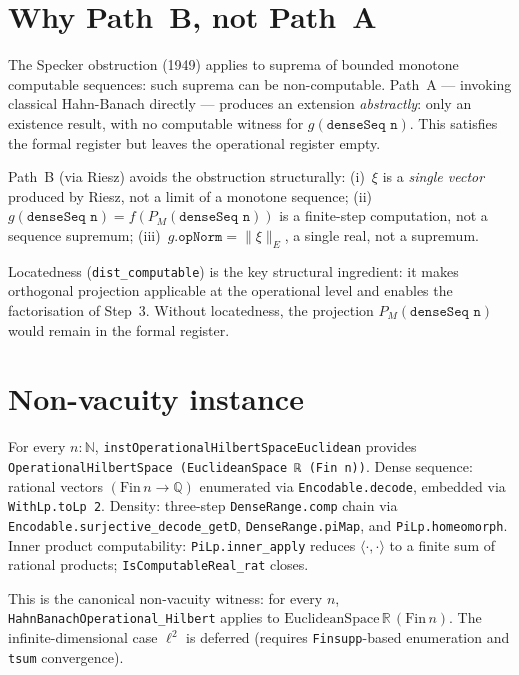\section{Why Path~B, not Path~A}
\label{sec:audit_path_b}

\begin{remark}
\label{rem:path_b}
The Specker obstruction (1949) applies to suprema of bounded monotone
computable sequences: such suprema can be non-computable.  Path~A ---
invoking classical Hahn-Banach directly --- produces an extension
\emph{abstractly}: only an existence result, with no computable witness
for $g(\texttt{denseSeq n})$.  This satisfies the formal register but
leaves the operational register empty.

Path~B (via Riesz) avoids the obstruction structurally:
(i)~$\xi$ is a \emph{single vector} produced by Riesz, not a limit of a
  monotone sequence;
(ii)~$g(\texttt{denseSeq n}) = f(P_M(\texttt{denseSeq n}))$ is a
  finite-step computation, not a sequence supremum;
(iii)~$g.\texttt{opNorm} = \|\xi\|_E$, a single real, not a supremum.

Locatedness (\texttt{dist\_computable}) is the key structural ingredient:
it makes orthogonal projection applicable at the operational level and
enables the factorisation of Step~3.  Without locatedness, the projection
$P_M(\texttt{denseSeq n})$ would remain in the formal register.
\end{remark}

\section{Non-vacuity instance}
\label{sec:audit_euclidean}

\begin{theorem}
\label{thm:instEuclidean}
\leanok
{}
For every $n : \mathbb{N}$, \texttt{instOperationalHilbertSpaceEuclidean}
provides \texttt{OperationalHilbertSpace (EuclideanSpace ℝ (Fin n))}.
Dense sequence: rational vectors $(\mathrm{Fin}\,n \to \mathbb{Q})$
enumerated via \texttt{Encodable.decode}, embedded via \texttt{WithLp.toLp 2}.
Density: three-step \texttt{DenseRange.comp} chain via
\texttt{Encodable.surjective\_decode\_getD},
\texttt{DenseRange.piMap}, and \texttt{PiLp.homeomorph}.
Inner product computability: \texttt{PiLp.inner\_apply} reduces $\langle\cdot,
\cdot\rangle$ to a finite sum of rational products; \texttt{IsComputableReal\_rat}
closes.

This is the canonical non-vacuity witness: for every $n$,
\texttt{HahnBanachOperational\_Hilbert} applies to
$\mathrm{EuclideanSpace}\,\mathbb{R}\,(\mathrm{Fin}\,n)$.
The infinite-dimensional case $\ell^2$ is deferred (requires
\texttt{Finsupp}-based enumeration and \texttt{tsum} convergence).
\end{theorem}

